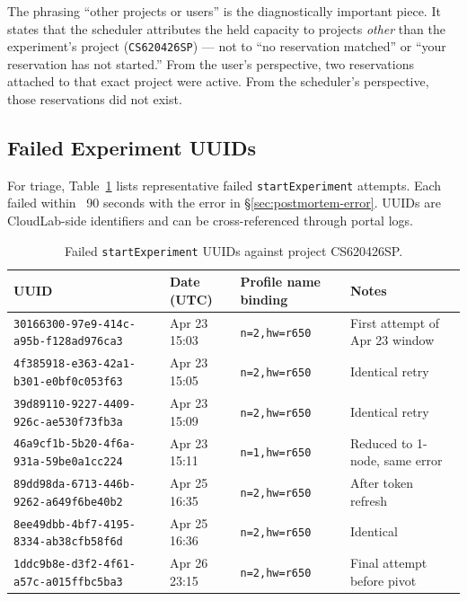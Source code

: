 \documentclass[11pt,a4paper]{article}
\begin{document}
The phrasing ``other projects or users'' is the diagnostically important piece. It states that the scheduler attributes the held capacity to projects \emph{other} than the experiment's project (\texttt{CS620426SP}) --- not to ``no reservation matched'' or ``your reservation has not started.'' From the user's perspective, two reservations attached to that exact project were active. From the scheduler's perspective, those reservations did not exist.

\subsection{Failed Experiment UUIDs}

For triage, Table~\ref{tab:failed-experiments} lists representative failed \texttt{startExperiment} attempts. Each failed within ~90 seconds with the error in \S\ref{sec:postmortem-error}. UUIDs are CloudLab-side identifiers and can be cross-referenced through portal logs.

\begin{table}[H]
\centering
\scriptsize
\caption{Failed \texttt{startExperiment} UUIDs against project CS620426SP.}
\label{tab:failed-experiments}
\begin{tabular}{@{}llll@{}}
\toprule
UUID & Date (UTC) & Profile name binding & Notes \\
\midrule
\texttt{30166300-97e9-414c-a95b-f128ad976ca3} & Apr 23 15:03 & \texttt{n=2,hw=r650} & First attempt of Apr 23 window \\
\texttt{4f385918-e363-42a1-b301-e0bf0c053f63} & Apr 23 15:05 & \texttt{n=2,hw=r650} & Identical retry \\
\texttt{39d89110-9227-4409-926c-ae530f73fb3a} & Apr 23 15:09 & \texttt{n=2,hw=r650} & Identical retry \\
\texttt{46a9cf1b-5b20-4f6a-931a-59be0a1cc224} & Apr 23 15:11 & \texttt{n=1,hw=r650} & Reduced to 1-node, same error \\
\texttt{89dd98da-6713-446b-9262-a649f6be40b2} & Apr 25 16:35 & \texttt{n=2,hw=r650} & After token refresh \\
\texttt{8ee49dbb-4bf7-4195-8334-ab38cfb58f6d} & Apr 25 16:36 & \texttt{n=2,hw=r650} & Identical \\
\texttt{1ddc9b8e-d3f2-4f61-a57c-a015ffbc5ba3} & Apr 26 23:15 & \texttt{n=2,hw=r650} & Final attempt before pivot \\
\bottomrule
\end{tabular}
\end{table}
\end{document}

